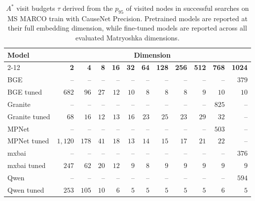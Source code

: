 \begin{table}[H]
\centering
\small
\caption{$A^*$ visit budgets $\tau$ derived from the $p_{95}$ of visited nodes in successful searches on MS MARCO train with CauseNet Precision. Pretrained models are reported at their full embedding dimension, while fine-tuned models are reported across all evaluated Matryoshka dimensions.}
\label{tab:p95-visited-nodes}
\begin{tabular}{@{}p{2.39cm}rrrrrrrrrrr@{}}
\toprule
\textbf{Model} & \multicolumn{11}{c}{\textbf{Dimension}} \\
\cmidrule(l){2-12}
 & \textbf{2} & \textbf{4} & \textbf{8} & \textbf{16} & \textbf{32} & \textbf{64} & \textbf{128} & \textbf{256} & \textbf{512} & \textbf{768} & \textbf{1024} \\
\midrule
BGE & -- & -- & -- & -- & -- & -- & -- & -- & -- & -- & $379$ \\
BGE tuned & $682$ & $96$ & $27$ & $12$ & $10$ & $8$ & $8$ & $8$ & $9$ & $10$ & $10$ \\

Granite & -- & -- & -- & -- & -- & -- & -- & -- & -- & $825$ & -- \\
Granite tuned & $68$ & $16$ & $12$ & $13$ & $16$ & $23$ & $25$ & $23$ & $29$ & $32$ & -- \\

MPNet & -- & -- & -- & -- & -- & -- & -- & -- & -- & $503$ & -- \\
MPNet tuned & $1{,}120$ & $178$ & $41$ & $18$ & $13$ & $14$ & $15$ & $17$ & $21$ & $22$ & -- \\

mxbai & -- & -- & -- & -- & -- & -- & -- & -- & -- & -- & $376$ \\
mxbai tuned & $247$ & $62$ & $20$ & $12$ & $9$ & $8$ & $9$ & $9$ & $9$ & $9$ & $9$ \\

Qwen & -- & -- & -- & -- & -- & -- & -- & -- & -- & -- & $594$ \\
Qwen tuned & $253$ & $105$ & $10$ & $6$ & $5$ & $5$ & $5$ & $5$ & $5$ & $6$ & $5$ \\
\bottomrule
\end{tabular}
\end{table}
